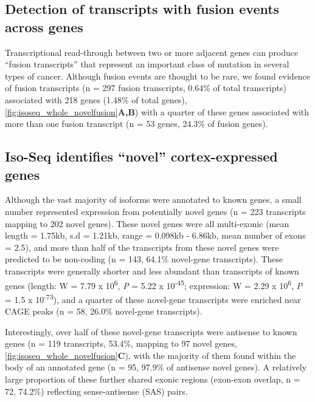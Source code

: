 \subsection{Detection of transcripts with fusion events across genes}
\label{ch4:fusion_trans}
Transcriptional read-through between two or more adjacent genes can produce “fusion transcripts” that represent an important class of mutation in several types of cancer\cite{McCartney2019}. Although fusion events are thought to be rare\cite{Akiva2006a}, we found evidence of fusion transcripts (n = 297 fusion transcripts, 0.64\% of total transcripts) associated with 218 genes (1.48\% of total genes), \cref{fig:isoseq_whole_novelfusion}\textbf{A,B}) with a quarter of these genes associated with more than one fusion transcript (n = 53 genes, 24.3\% of fusion genes).

\subsection{Iso-Seq identifies “novel” cortex-expressed genes}
\label{sec:whole_novelgenes}
Although the vast majority of isoforms were annotated to known genes, a small number represented expression from potentially novel genes (n = 223 transcripts mapping to 202 novel genes).  These novel genes were all multi-exonic (mean length = 1.75kb, s.d = 1.21kb, range = 0.098kb - 6.86kb, mean number of exons = 2.5), and more than half of the transcripts from these novel genes were predicted to be non-coding (n = 143, 64.1\% novel-gene transcripts). These transcripts were generally shorter and less abundant than transcripts of known genes (length: W = 7.79 x 10\textsuperscript{6}, \textit{P} = 5.22 x 10\textsuperscript{-45}; expression: W = 2.29 x 10\textsuperscript{6}, \textit{P} = 1.5 x 10\textsuperscript{-73}), and a quarter of these novel-gene transcripts were enriched near CAGE peaks (n = 58, 26.0\% novel-gene transcripts). 

Interestingly, over half of these novel-gene transcripts were antisense to known genes (n = 119 transcripts, 53.4\%, mapping to 97 novel genes, \cref{fig:isoseq_whole_novelfusion}\textbf{C}), with the majority of them found within the body of an annotated gene (n = 95, 97.9\% of antisense novel genes). A relatively large proportion of these further shared exonic regions (exon-exon overlap, n = 72, 74.2\%) reflecting sense-antisense (SAS) pairs. 

